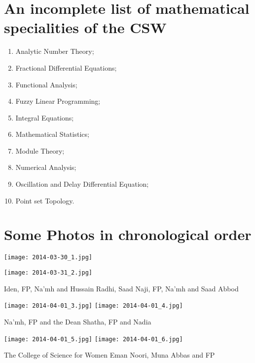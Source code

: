 \documentclass[12pt,a4paper]{scrartcl}
\begin{document}
\section{An incomplete list of mathematical specialities of the CSW}

\begin{enumerate}[I]
\item Analytic Number Theory; 
\item Fractional Differential Equations; 
\item Functional Analysis;
\item Fuzzy Linear Programming; 
\item Integral Equations;
\item Mathematical Statistics;
\item Module Theory;
\item Numerical Analysis;   
\item Oscillation and Delay Differential Equation;
\item Point set Topology.
\end{enumerate}
\vfill \newpage

\section{Some Photos in chronological order}



\texttt{[image: 2014-03-30\_1.jpg]}\hspace{2.1cm}\begin{minipage}[t]{9cm}
\texttt{[image: 2014-03-31\_2.jpg]}
                                          \end{minipage}
                                          
\small{\hspace*{.50cm} Iden, FP, Na'mh and Hussain\hspace{3.6cm} Radhi, Saad Naji, FP, Na'mh and Saad Abbod}\bigskip

\texttt{[image: 2014-04-01\_3.jpg]}\hspace{.5cm}
\texttt{[image: 2014-04-01\_4.jpg]}

\small{\hspace{1.9cm} Na'mh, FP and the Dean\hspace{5cm} Shatha, FP and Nadia}\bigskip

\texttt{[image: 2014-04-01\_5.jpg]}\hspace{.5cm}
\texttt{[image: 2014-04-01\_6.jpg]}

\small{\hspace{0.9cm} The College of Science for Women\hspace{3cm}  Eman Noori, Muna Abbas and FP}
\end{document}
